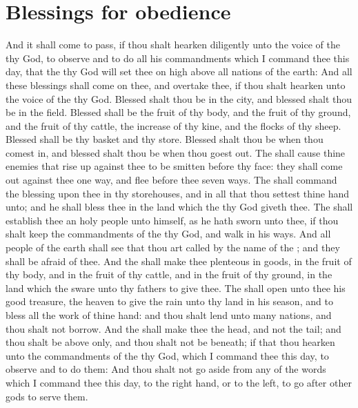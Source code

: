 \section*{Blessings for obedience}
\begin{biblechapter} %
\verse And it shall come to pass, if thou shalt hearken diligently unto the voice of the \LORD thy God, to observe and to do all his commandments which I command thee this day, that the \LORD thy God will set thee on high above all nations of the earth:
\verse And all these blessings shall come on thee, and overtake thee, if thou shalt hearken unto the voice of the \LORD thy God.
\verse Blessed shalt thou be in the city, and blessed shalt thou be in the field.
\verse Blessed shall be the fruit of thy body, and the fruit of thy ground, and the fruit of thy cattle, the increase of thy kine, and the flocks of thy sheep.
\verse Blessed shall be thy basket and thy store.
\verse Blessed shalt thou be when thou comest in, and blessed shalt thou be when thou goest out.
\verse The \LORD shall cause thine enemies that rise up against thee to be smitten before thy face: they shall come out against thee one way, and flee before thee seven ways.
\verse The \LORD shall command the blessing upon thee in thy storehouses, and in all that thou settest thine hand unto; and he shall bless thee in the land which the \LORD thy God giveth thee.
\verse The \LORD shall establish thee an holy people unto himself, as he hath sworn unto thee, if thou shalt keep the commandments of the \LORD thy God, and walk in his ways.
\verse And all people of the earth shall see that thou art called by the name of the \LORD; and they shall be afraid of thee.
\verse And the \LORD shall make thee plenteous in goods, in the fruit of thy body, and in the fruit of thy cattle, and in the fruit of thy ground, in the land which the \LORD sware unto thy fathers to give thee.
\verse The \LORD shall open unto thee his good treasure, the heaven to give the rain unto thy land in his season, and to bless all the work of thine hand: and thou shalt lend unto many nations, and thou shalt not borrow.
\verse And the \LORD shall make thee the head, and not the tail; and thou shalt be above only, and thou shalt not be beneath; if that thou hearken unto the commandments of the \LORD thy God, which I command thee this day, to observe and to do them:
\verse And thou shalt not go aside from any of the words which I command thee this day, to the right hand, or to the left, to go after other gods to serve them.

\end{biblechapter}
